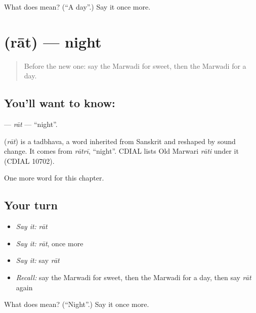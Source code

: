 \begin{tcolorbox}[breakable,colback=teal!4,colframe=teal!35!black,title={Before you move on}]
What does  mean? (\textquotedblleft{}A day\textquotedblright{}.) Say it once more.
\end{tcolorbox}
\section[\texorpdfstring{\mw{रात} (rāt)}{रात (rāt)}]{ (rāt) — night}

\label{lesson:MW-C78-rat}



\begin{quote}
Before the new one: say the Marwadi for sweet, then the Marwadi for a day.
\end{quote}

\subsection*{You'll want to know: }
\textbf{} — \emph{rāt} — \textquotedblleft{}night\textquotedblright{}.

\begin{cousinweb}
\textbf{} (\emph{rāt}) is a tadbhava, a word inherited from Sanskrit and reshaped by sound change. It comes from \emph{rātrī}, \textquotedblleft{}night\textquotedblright{}. CDIAL lists Old Marwari \emph{rāti} under it (CDIAL 10702).
\end{cousinweb}

\begin{grammarlens}[title={What you've built}]
One more word for this chapter.
\end{grammarlens}

\subsection*{Your turn}
\begin{itemize}
\raggedright
  \item \emph{Say it:} \emph{rāt}
  \item \emph{Say it:} \emph{rāt}, once more
  \item \emph{Say it:} say \emph{rāt}
  \item \emph{Recall:} say the Marwadi for sweet, then the Marwadi for a day, then say \emph{rāt} again
\end{itemize}

\begin{tcolorbox}[breakable,colback=teal!4,colframe=teal!35!black,title={Before you move on}]
What does  mean? (\textquotedblleft{}Night\textquotedblright{}.) Say it once more.
\end{tcolorbox}
